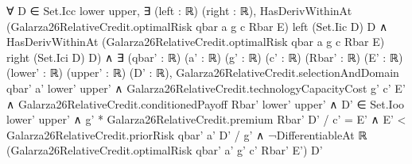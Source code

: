 \documentclass[10pt]{article}
\begin{document}
\begin{ReviewVerbatim}
                        ∀ D ∈ Set.Icc lower upper,
                          ∃ (left : ℝ) (right : ℝ),
                            HasDerivWithinAt (Galarza26RelativeCredit.optimalRisk qbar a g c Rbar E) left (Set.Iic D)
                                D ∧
                              HasDerivWithinAt (Galarza26RelativeCredit.optimalRisk qbar a g c Rbar E) right (Set.Ici D)
                                D) ∧
  ∃ (qbar' : ℝ) (a' : ℝ) (g' : ℝ) (c' : ℝ) (Rbar' : ℝ) (E' : ℝ) (lower' : ℝ) (upper' : ℝ) (D' : ℝ),
    Galarza26RelativeCredit.selectionAndDomain qbar' a' lower' upper' ∧
      Galarza26RelativeCredit.technologyCapacityCost g' c' E' ∧
        Galarza26RelativeCredit.conditionedPayoff Rbar' lower' upper' ∧
          D' ∈ Set.Ioo lower' upper' ∧
            g' * Galarza26RelativeCredit.premium Rbar' D' / c' = E' ∧
              E' < Galarza26RelativeCredit.priorRisk qbar' a' D' / g' ∧
                ¬DifferentiableAt ℝ (Galarza26RelativeCredit.optimalRisk qbar' a' g' c' Rbar' E') D'
\end{ReviewVerbatim}
\end{document}
